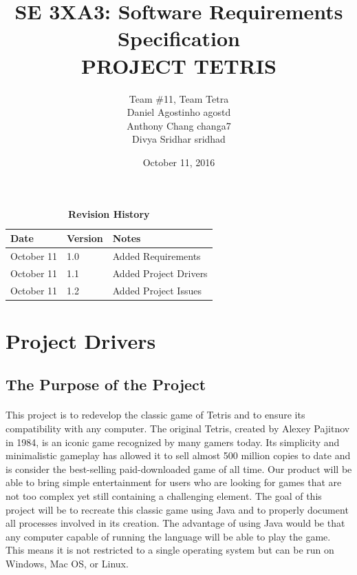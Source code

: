 \documentclass[12pt, titlepage]{article}
\title{SE 3XA3: Software Requirements Specification\\PROJECT TETRIS}
\author{Team \#11, Team Tetra
		\\ Daniel Agostinho agostd
		\\ Anthony Chang changa7
		\\ Divya Sridhar sridhad
}
\date{October 11, 2016}
\begin{document}
\maketitle

\tableofcontents
\listoftables
\listoffigures


\begin{table}[bp]
\caption{\bf Revision History}
\begin{tabularx}{\textwidth}{p{3cm}p{2cm}X}
\toprule {\bf Date} & {\bf Version} & {\bf Notes}\\
\midrule
October 11& 1.0 & Added Requirements\\
October 11 & 1.1 & Added Project Drivers\\
October 11 & 1.2 & Added Project Issues\\
\bottomrule
\end{tabularx}
\end{table}

\newpage


\section{Project Drivers}

\subsection{The Purpose of the Project}
\paragraph {}
This project is to redevelop the classic game of Tetris and to ensure its compatibility with any computer. The original Tetris, created by Alexey Pajitnov in 1984, is an iconic game recognized by many gamers today. Its simplicity and minimalistic gameplay has allowed it to sell almost 500 million copies to date and is consider the best-selling paid-downloaded game of all time. 
Our product will be able to bring simple entertainment for users who are looking for games that are not too complex yet still containing a challenging element. The goal of this project will be to recreate this classic game using Java and to properly document all processes involved in its creation. The advantage of using Java would be that any computer capable of running the language will be able to play the game. This means it is not restricted to a single operating system but can be run on Windows, Mac OS, or Linux.
\end{document}
